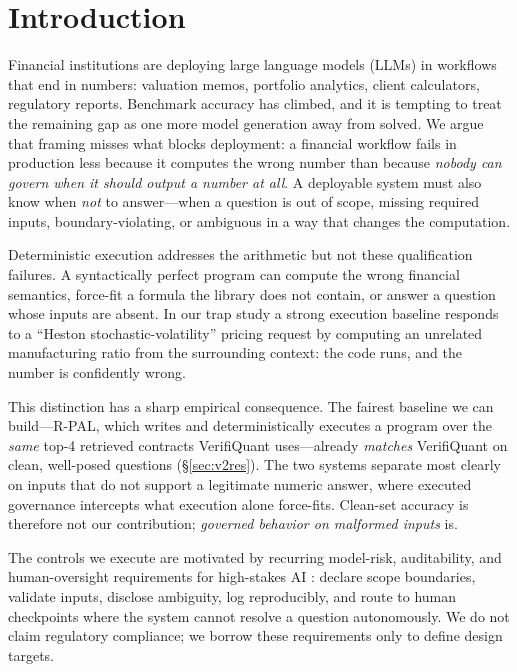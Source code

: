 \maketitle

\section{Introduction}
Financial institutions are deploying large language models (LLMs) in workflows that end in numbers: valuation memos, portfolio analytics, client calculators, regulatory reports.
Benchmark accuracy has climbed, and it is tempting to treat the remaining gap as one more model generation away from solved.
We argue that framing misses what blocks deployment: a financial workflow fails in production less because it computes the wrong number than because \emph{nobody can govern when it should output a number at all}.
A deployable system must also know when \emph{not} to answer---when a question is out of scope, missing required inputs, boundary-violating, or ambiguous in a way that changes the computation.

Deterministic execution addresses the arithmetic but not these qualification failures.
A syntactically perfect program can compute the wrong financial semantics, force-fit a formula the library does not contain, or answer a question whose inputs are absent.
In our trap study a strong execution baseline responds to a ``Heston stochastic-volatility'' pricing request by computing an unrelated manufacturing ratio from the surrounding context: the code runs, and the number is confidently wrong.

This distinction has a sharp empirical consequence.
The fairest baseline we can build---R-PAL, which writes and deterministically executes a program over the \emph{same} top-4 retrieved contracts VerifiQuant uses---already \emph{matches} VerifiQuant on clean, well-posed questions (\S\ref{sec:v2res}).
The two systems separate most clearly on inputs that do not support a legitimate numeric answer, where executed governance intercepts what execution alone force-fits.
Clean-set accuracy is therefore not our contribution; \emph{governed behavior on malformed inputs} is.

The controls we execute are motivated by recurring model-risk, auditability, and human-oversight requirements for high-stakes AI \cite{fed2011sr117,euaiact2024,finra2020ai}: declare scope boundaries, validate inputs, disclose ambiguity, log reproducibly, and route to human checkpoints where the system cannot resolve a question autonomously.
We do not claim regulatory compliance; we borrow these requirements only to define design targets.

